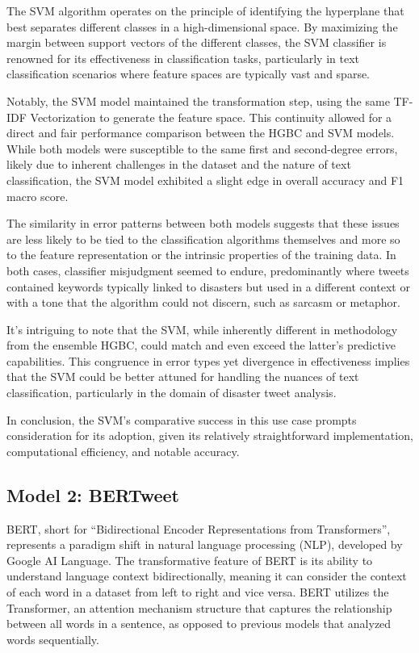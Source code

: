 \documentclass[10pt,table]{article}
\begin{document}
The SVM algorithm operates on the principle of identifying the hyperplane that best separates different classes in a high-dimensional space. By maximizing the margin between support vectors of the different classes, the SVM classifier is renowned for its effectiveness in classification tasks, particularly in text classification scenarios where feature spaces are typically vast and sparse.

Notably, the SVM model maintained the transformation step, using the same TF-IDF Vectorization to generate the feature space. This continuity allowed for a direct and fair performance comparison between the HGBC and SVM models. While both models were susceptible to the same first and second-degree errors, likely due to inherent challenges in the dataset and the nature of text classification, the SVM model exhibited a slight edge in overall accuracy and F1 macro score.

The similarity in error patterns between both models suggests that these issues are less likely to be tied to the classification algorithms themselves and more so to the feature representation or the intrinsic properties of the training data. In both cases, classifier misjudgment seemed to endure, predominantly where tweets contained keywords typically linked to disasters but used in a different context or with a tone that the algorithm could not discern, such as sarcasm or metaphor.

It's intriguing to note that the SVM, while inherently different in methodology from the ensemble HGBC, could match and even exceed the latter's predictive capabilities. This congruence in error types yet divergence in effectiveness implies that the SVM could be better attuned for handling the nuances of text classification, particularly in the domain of disaster tweet analysis.

In conclusion, the SVM's comparative success in this use case prompts consideration for its adoption, given its relatively straightforward implementation, computational efficiency, and notable accuracy.

\subsection{Model 2: BERTweet}
BERT, short for \enquote{Bidirectional Encoder Representations from Transformers}, represents a paradigm shift in natural language processing (NLP), developed by Google AI Language. The transformative feature of BERT is its ability to understand language context bidirectionally, meaning it can consider the context of each word in a dataset from left to right and vice versa. BERT utilizes the Transformer, an attention mechanism structure that captures the relationship between all words in a sentence, as opposed to previous models that analyzed words sequentially.
\end{document}
